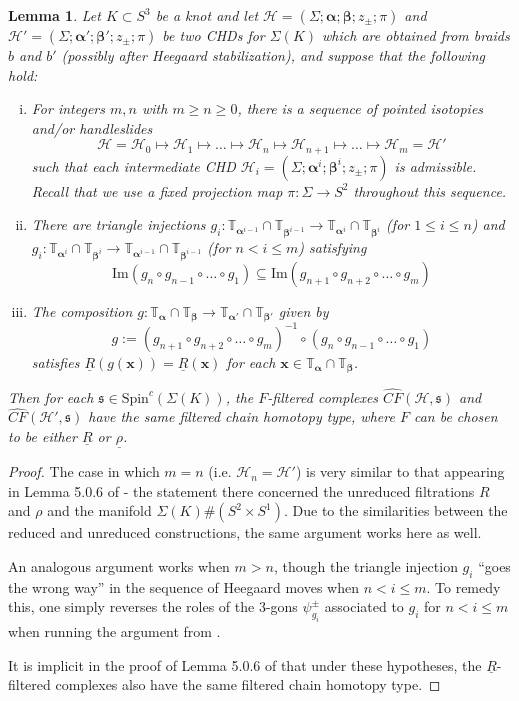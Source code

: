 \documentclass[11pt]{article}
\theoremstyle{plain} \newtheorem{thm}{Theorem}[subsection]
\theoremstyle{plain} \newtheorem{cor}[thm]{Corollary}
\theoremstyle{plain} \newtheorem{prop}[thm]{Proposition}
\theoremstyle{plain} \newtheorem{conj}[thm]{Conjecture}
\theoremstyle{plain} \newtheorem{lem}[thm]{Lemma}
\theoremstyle{definition} \newtheorem{df}[thm]{Definition}
\theoremstyle{remark} \newtheorem{rmk}[thm]{Remark}
\theoremstyle{remark} \newtheorem{obs}[thm]{Observation}
\newcommand{\DBCs}[1]{\Sigma(#1)\#(S^{2}\times S^{1})}
\newcommand{\DBC}[1]{\Sigma(#1)}
\newcommand{\h}{\mathcal{H}}
\newcommand{\red}[1]{\underline{#1}}
\newcommand{\Sc}[1]{\text{Spin}^{c}(\DBC{#1})}
\newcommand{\ba}{\boldsymbol{\alpha}}
\newcommand{\bb}{\boldsymbol{\beta}}
\newcommand{\Ta}{\mathbb{T}_{\ba}}
\newcommand{\Tb}{\mathbb{T}_{\bb}}
\newcommand{\Tap}{\tor{\ba'}}
\newcommand{\Tbp}{\tor{\bb'}}
\newcommand{\bx}{\mathbf{x}}
\newcommand{\tor}[1]{\mathbb{T}_{#1}}
\numberwithin{equation}{section}
\begin{document}
\begin{lem}\label{lem:tri}
Let $K \subset S^3$ be a knot and let $\h = \left(\Sigma; \ba; \bb; z_{\pm}; \pi\right)$ and $\h' = \left(\Sigma; \ba'; \bb'; z_{\pm}; \pi\right)$ be two CHDs for $\DBC{K}$ which are obtained from braids $b$ and $b'$ (possibly after Heegaard stabilization), and suppose that the following hold:

\begin{enumerate}[(i)]
\item For integers $m,n$ with $m \geq n \geq 0$, there is a sequence of pointed isotopies and/or handleslides
$$ \h =\h_0 \mapsto \h_1\mapsto \ldots \mapsto \h_{n}  \mapsto \h_{n+1} \mapsto \ldots \mapsto \h_m = \h'$$
such that each intermediate CHD $\h_{i} = \left( \Sigma; \ba^i; \bb^i; z_{\pm}; \pi \right)$ is admissible.  Recall that we use a fixed projection map $\pi: \Sigma \rightarrow S^2$ throughout this sequence.
\item There are triangle injections $g_i: \tor{\ba^{i-1}} \cap \tor{\bb^{i-1}} \rightarrow \tor{\ba^i} \cap \tor{\bb^i}$ (for $1 \leq i \leq n$) and $g_i:\tor{\ba^i} \cap \tor{\bb^i} \rightarrow \tor{\ba^{i-1}} \cap \tor{\bb^{i-1}}$ (for $n < i \leq m$) satisfying
$$ \text{Im} \left( g_n \circ g_{n-1} \circ \ldots \circ g_1  \right) \subseteq \text{Im} \left( g_{n+1} \circ g_{n+2} \circ \ldots \circ g_{m} \right)$$
\item The composition $g: \Ta \cap \Tb \rightarrow \Tap \cap \Tbp$ given by 
$$ g := \left(  g_{n+1} \circ g_{n+2} \circ \ldots \circ g_{m}\right)^{-1} \circ \left( g_n \circ g_{n-1} \circ \ldots \circ g_1 \right)$$
satisfies $\red{R}(g(\bx)) = \red{R}(\bx)$ for each $\bx \in \tor{\ba} \cap \tor{\bb}$.
\end{enumerate}
Then for each $\mathfrak{s} \in \Sc{K}$, the $F$-filtered complexes $\widehat{CF}(\h, \mathfrak{s})$ and $\widehat{CF}(\h', \mathfrak{s})$ have the same filtered chain homotopy type, where $F$ can be chosen to be either $\red{R}$ or $\red{\rho}$.
\end{lem}

\begin{proof}
The case in which $m = n$ (i.e. $\h_n = \h'$) is very similar to that appearing in Lemma 5.0.6 of \cite{et:R} - the statement there concerned the unreduced filtrations $R$ and $\rho$ and the manifold $\DBCs{K}$.  Due to the similarities between the reduced and unreduced constructions, the same argument works here as well.

An analogous argument works when $m > n$, though the triangle injection $g_i$ ``goes the wrong way'' in the sequence of Heegaard moves when $n < i \leq m$.  To remedy this, one simply reverses the roles of the 3-gons $\psi_{g_{i}}^{\pm}$ associated to $g_{i}$ for $n < i \leq m$ when running the argument from \cite{et:R}.

It is implicit in the proof of Lemma 5.0.6 of \cite{et:R} that under these hypotheses, the $\red{R}$-filtered complexes also have the same filtered chain homotopy type.
\end{proof}
\end{document}
